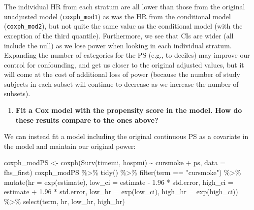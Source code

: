 \documentclass[
]{book}
\newenvironment{Shaded}{\begin{snugshade}}{\end{snugshade}}
\newcommand{\AttributeTok}[1]{\textcolor[rgb]{0.77,0.63,0.00}{#1}}
\newcommand{\FloatTok}[1]{\textcolor[rgb]{0.00,0.00,0.81}{#1}}
\newcommand{\FunctionTok}[1]{\textcolor[rgb]{0.00,0.00,0.00}{#1}}
\newcommand{\NormalTok}[1]{#1}
\newcommand{\OtherTok}[1]{\textcolor[rgb]{0.56,0.35,0.01}{#1}}
\newcommand{\SpecialCharTok}[1]{\textcolor[rgb]{0.00,0.00,0.00}{#1}}
\newcommand{\StringTok}[1]{\textcolor[rgb]{0.31,0.60,0.02}{#1}}
\providecommand{\tightlist}{%
  \setlength{\itemsep}{0pt}\setlength{\parskip}{0pt}}
\begin{document}
The individual HR from each stratum are all lower than those from the original unadjusted model (\texttt{coxph\_mod1}) as was the HR from the conditional model (\texttt{coxph\_mod2}), but not quite the same value as the conditional model (with the exception of the third quantile). Furthermore, we see that CIs are wider (all include the null) as we lose power when looking in each individual stratum. Expanding the number of categories for the PS (e.g., to deciles) may improve our control for confounding, and get us closer to the original adjusted values, but it will come at the cost of additional loss of power (because the number of study subjects in each subset will continue to decrease as we increase the number of subsets).

\begin{enumerate}
\def\labelenumi{\arabic{enumi}.}
\setcounter{enumi}{1}
\tightlist
\item
  \textbf{Fit a Cox model with the propensity score in the model. How do these results compare to the ones above?}
\end{enumerate}

We can instead fit a model including the original continuous PS as a covariate in the model and maintain our original power:

\begin{Shaded}
\begin{Highlighting}[]
\NormalTok{coxph\_modPS }\OtherTok{\textless{}{-}} \FunctionTok{coxph}\NormalTok{(}\FunctionTok{Surv}\NormalTok{(timemi, hospmi) }\SpecialCharTok{\textasciitilde{}}\NormalTok{ cursmoke }\SpecialCharTok{+}\NormalTok{ ps, }
                    \AttributeTok{data =}\NormalTok{ fhs\_first)}
\NormalTok{coxph\_modPS }\SpecialCharTok{\%\textgreater{}\%} 
  \FunctionTok{tidy}\NormalTok{() }\SpecialCharTok{\%\textgreater{}\%} 
  \FunctionTok{filter}\NormalTok{(term }\SpecialCharTok{==} \StringTok{"cursmoke"}\NormalTok{) }\SpecialCharTok{\%\textgreater{}\%} 
  \FunctionTok{mutate}\NormalTok{(}\AttributeTok{hr =} \FunctionTok{exp}\NormalTok{(estimate),}
         \AttributeTok{low\_ci =}\NormalTok{ estimate }\SpecialCharTok{{-}} \FloatTok{1.96} \SpecialCharTok{*}\NormalTok{ std.error, }
         \AttributeTok{high\_ci =}\NormalTok{ estimate }\SpecialCharTok{+} \FloatTok{1.96} \SpecialCharTok{*}\NormalTok{ std.error, }
         \AttributeTok{low\_hr =} \FunctionTok{exp}\NormalTok{(low\_ci), }
         \AttributeTok{high\_hr =} \FunctionTok{exp}\NormalTok{(high\_ci)) }\SpecialCharTok{\%\textgreater{}\%} 
  \FunctionTok{select}\NormalTok{(term, hr, low\_hr, high\_hr)}
\end{Highlighting}
\end{Shaded}
\end{document}
